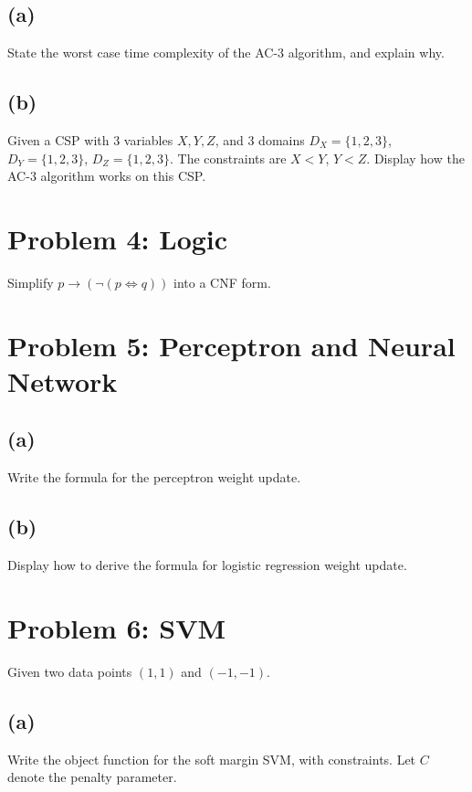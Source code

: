 \documentclass[a4paper,12pt]{article}
\begin{document}
\subsection*{(a)}

State the worst case time complexity of the AC-3 algorithm, and explain why.

\subsection*{(b)}

Given a CSP with 3 variables $X, Y, Z$, and 3 domains $D_X = \{1, 2, 3\}$, $D_Y = \{1, 2, 3\}$, $D_Z = \{1, 2, 3\}$. The constraints are $X < Y$, $Y < Z$. Display how the AC-3 algorithm works on this CSP.

\section*{Problem 4: Logic}

Simplify $p \to (\neg (p \Leftrightarrow q))$ into a CNF form.

\section*{Problem 5: Perceptron and Neural Network}

\subsection*{(a)}

Write the formula for the perceptron weight update.

\subsection*{(b)}

Display how to derive the formula for logistic regression weight update.

\section*{Problem 6: SVM}

Given two data points $(1, 1)$ and $(-1, -1)$.

\subsection*{(a)}

Write the object function for the soft margin SVM, with constraints. Let $C$ denote the penalty parameter.
\end{document}
